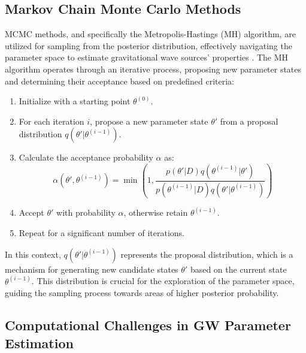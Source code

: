 \documentclass[12pt]{article}
\begin{document}
\subsection{Markov Chain Monte Carlo Methods}
MCMC methods, and specifically the Metropolis-Hastings (MH) algorithm, are utilized for sampling from the posterior distribution, effectively navigating the parameter space to estimate gravitational wave sources' properties \cite{vanderSluys2008}. The MH algorithm operates through an iterative process, proposing new parameter states and determining their acceptance based on predefined criteria:

\begin{enumerate}
    \item Initialize with a starting point \( \theta^{(0)} \).
    \item For each iteration \( i \), propose a new parameter state \( \theta' \) from a proposal distribution \( q(\theta' | \theta^{(i-1)}) \).
    \item Calculate the acceptance probability \( \alpha \) as:
    \[ \alpha(\theta', \theta^{(i-1)}) = \min\left(1, \frac{p(\theta' | D) q(\theta^{(i-1)} | \theta')}{p(\theta^{(i-1)} | D) q(\theta' | \theta^{(i-1)})}\right) \]
    \item Accept \( \theta' \) with probability \( \alpha \), otherwise retain \( \theta^{(i-1)} \).
    \item Repeat for a significant number of iterations.
\end{enumerate}

In this context, \( q(\theta' | \theta^{(i-1)}) \) represents the proposal distribution, which is a mechanism for generating new candidate states \( \theta' \) based on the current state \( \theta^{(i-1)} \). This distribution is crucial for the exploration of the parameter space, guiding the sampling process towards areas of higher posterior probability.

\subsection{Computational Challenges in GW Parameter Estimation}
\end{document}
